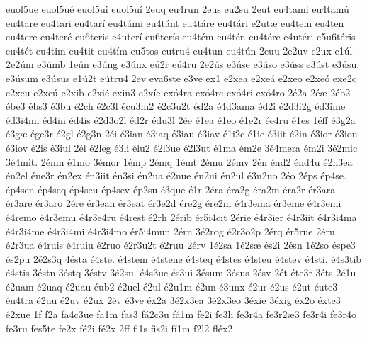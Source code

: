 {euol5ue
euol5u^^e9
euol5ui
euol5u^^ed
2euq
eu4run
2eus
eu2su
2eut
eu4tami
eu4tam^^fa
eu4tare
eu4tari
eu4tar^^ed
eu4t^^e1mi
eu4t^^e1nt
eu4t^^e1re
eu4t^^e1ri
e2ut^^e6
eu4tem
eu4ten
eu4tere
eu4ter^^e9
eu6teris
e4uter^^ed
eu6ter^^eds
eu4t^^e9m
eu4t^^e9n
eu4t^^e9re
e4ut^^e9ri
e5u6t^^e9ris
eu4t^^e9t
eu4tim
eu4tit
eu4t^^edm
eu5tos
eutru4
eu4tun
eu4t^^fan
2euu
2e2uv
e2ux
e1^^fal
2e2^^fam
e3^^famb
1e^^fan
e3^^fang
e3^^fanx
e^^fa2r
e^^fa4ru
2e2^^fas
e3^^fase
e3^^faso
e3^^fass
e3^^fast
e3^^fasu.
e3^^fasum
e3^^fasus
e1^^fa2t
e^^fatru4
2ev
eva6ste
e3ve
ex1
e2xea
e2xe^^e1
e2xeo
e2xe^^f3
exe2q
e2xeu
e2xe^^fa
e2xib
e2xi^^e9
exin3
e2x^^ede
ex^^f34ra
ex^^f34re
ex^^f34ri
ex^^f34ro
2^^e92a
2^^e9^^e6
2^^e9b2
^^e9be3
^^e9bs3
^^e93bu
^^e92ch
^^e92c3l
^^e9cu3m2
^^e92c3u2t
^^e9d2a
^^e94d3ama
^^e9d2i
^^e92d3i2g
^^e9d3ime
^^e9d3i4mi
^^e9d4in
^^e9d4is
^^e92d3o2l
^^e9d2r
^^e9du3l
2^^e9e
^^e91ea
^^e91eo
^^e91e2r
^^e9e4ru
^^e91es
1^^e9ff
^^e93g2a
^^e93g^^e6
^^e9ge3r
^^e92gl
^^e92g3n
2^^e9i
^^e93ian
^^e93iaq
^^e93iau
^^e93iav
^^e91i2c
^^e91ie
^^e93iit
^^e92in
^^e93ior
^^e93iou
^^e93iov
^^e92is
^^e93iul
2^^e9l
^^e92leg
^^e93li
^^e9lu2
^^e92l3ue
^^e92l3ut
^^e91ma
^^e9m2e
3^^e94mera
^^e9m2i
3^^e92mic
3^^e94mit.
2^^e9mn
^^e91mo
3^^e9mor
1^^e9mp
2^^e9mq
1^^e9mt
2^^e9mu
2^^e9mv
2^^e9n
^^e9nd2
^^e9nd4u
^^e92n3ea
^^e9n2el
^^e9ne3r
^^e9n2ex
^^e9n3iit
^^e9n3si
^^e9n2ua
^^e92nue
^^e9n2ui
^^e9n2ul
^^e93n2uo
2^^e9o
2^^e9ps
^^e9p4se.
^^e9p4sen
^^e9p4seq
^^e9p4seu
^^e9p4sev
^^e9p2su
^^e93que
^^e91r
2^^e9ra
^^e9ra2g
^^e9ra2m
^^e9ra2r
^^e9r3ara
^^e9r3are
^^e9r3aro
2^^e9re
^^e9r3ean
^^e9r3eat
^^e9r3e2d
^^e9re2g
^^e9re2m
^^e94r3ema
^^e9r3eme
^^e94r3emi
^^e94remo
^^e94r3emu
^^e94r3e4ru
^^e94rest
^^e92rh
2^^e9rib
^^e9r5i4cit
2^^e9rie
^^e94r3ier
^^e94r3iit
^^e94r3i4ma
^^e94r3i4me
^^e94r3i4mi
^^e94r3i4mo
^^e9r5i4mun
2^^e9rn
3^^e92rog
^^e92r3o2p
2^^e9rq
^^e9r5rue
2^^e9ru
^^e92r3ua
^^e94ruis
^^e94ruiu
^^e92ruo
^^e92r3u2t
^^e92ruu
2^^e9rv
1^^e92sa
1^^e92s^^e6
^^e9s2i
2^^e9sn
1^^e92so
^^e9spe3
^^e9s2pu
2^^e92s3q
4^^e9sta
^^e94ste.
^^e94stem
^^e94stene
^^e94steq
^^e94stes
^^e94steu
^^e94stev
^^e94sti.
^^e94s3tib
^^e94stis
3^^e9stn
3^^e9stq
3^^e9stv
3^^e92su.
^^e94s3ue
^^e9s3ui
3^^e9sum
3^^e9sus
2^^e9sv
2^^e9t
^^e9te3r
3^^e9ts
2^^e91u
^^e92uam
^^e92uaq
^^e92uau
^^e9ub2
^^e92uel
^^e92ul
^^e92u1m
^^e92un
^^e93unx
^^e92ur
^^e92us
^^e92ut
^^e9ute3
^^e9u4tra
^^e92uu
^^e92uv
^^e92ux
2^^e9v
^^e93ve
^^e9x2a
3^^e92x3ea
3^^e92x3eo
3^^e9xie
3^^e9xig
^^e9x2o
^^e9xte3
^^e92xue
1f
f2a
fa4c3ue
fa1m
fas3
f^^e12c3u
f^^e11m
fe2i
fe3li
fe3r4a
fe3r2^^e63
fe3r4i
fe3r4o
fe3ru
fes5te
fe2x
f^^e92i
f^^e92x
2ff
fi1s
fis2i
f^^ed1m
f2l2
fl^^e9x2
}
